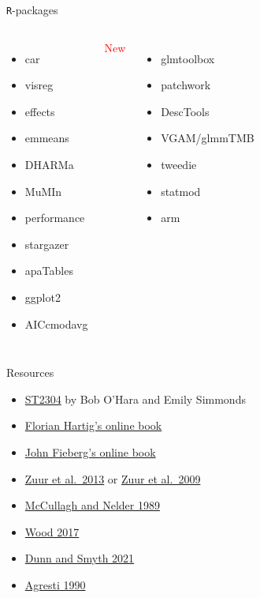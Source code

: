 \documentclass[
  ignorenonframetext,
]{beamer}
\providecommand{\tightlist}{%
  \setlength{\itemsep}{0pt}\setlength{\parskip}{0pt}}
\newcommand{\columnsbegin}{\begin{columns}}
\newcommand{\columnsend}{\end{columns}}
\begin{document}
\begin{frame}{\texttt{R}-packages}
\protect\hypertarget{packages}{}
\columnsbegin
{}

\begin{itemize}
\tightlist
\item
  car
\item
  visreg
\item
  effects
\item
  emmeans
\item
  DHARMa
\item
  MuMIn
\item
  performance
\item
  stargazer
\item
  apaTables
\item
  ggplot2
\item
  AICcmodavg
\end{itemize}


\textcolor{red}{New}

\begin{itemize}
\tightlist
\item
  glmtoolbox
\item
  patchwork
\item
  DescTools
\item
  VGAM/glmmTMB
\item
  tweedie
\item
  statmod
\item
  arm
\end{itemize}

\columnsend
\end{frame}

\begin{frame}{Resources}
\protect\hypertarget{resources}{}
\begin{itemize}
\item
  \href{https://wiki.math.ntnu.no/st2304/2024v/start}{ST2304} by Bob
  O'Hara and Emily Simmonds
\item
  \href{https://theoreticalecology.github.io/AdvancedRegressionModels}{Florian
  Hartig's online book}
\item
  \href{https://statistics4ecologists-v2.netlify.app/}{John Fieberg's
  online book}
\item
  \href{https://www.highstat.com/index.php/our-books?view=article\&id=21\&catid=18}{Zuur
  et al.~2013} or
  \href{https://www.highstat.com/index.php/our-books?view=article\&id=17\&catid=18}{Zuur
  et al.~2009}
\item
  \href{https://www.taylorfrancis.com/books/mono/10.1201/9780203753736/generalized-linear-models-mccullagh}{McCullagh
  and Nelder 1989}
\item
  \href{https://www.taylorfrancis.com/books/mono/10.1201/9781315370279/generalized-additive-models-simon-wood}{Wood
  2017}
\item
  \href{https://link.springer.com/book/10.1007/978-1-4419-0118-7}{Dunn
  and Smyth 2021}
\item
  \href{https://onlinelibrary.wiley.com/doi/book/10.1002/0471249688}{Agresti
  1990}
\end{itemize}
\end{frame}
\end{document}
